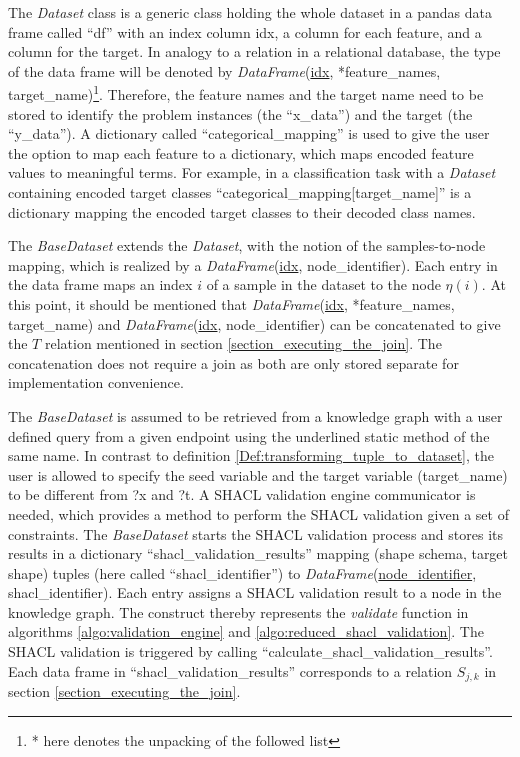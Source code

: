 The \emph{Dataset} class is a generic class holding the whole dataset in a pandas data frame called ``df'' with an index column idx, a column for each feature, and a column for the target. In analogy to a relation in a relational database, the type of the data frame will be denoted by \emph{DataFrame}(\underline{idx}, *feature\_names, target\_name)\footnote{* here denotes the unpacking of the followed list}.
Therefore, the feature names and the target name need to be stored to identify the problem instances (the ``x\_data'') and the target (the ``y\_data''). A dictionary called ``categorical\_mapping'' is used to give the user the option to map each feature to a dictionary, which maps encoded feature values to meaningful terms. For example, in a classification task with a \emph{Dataset} containing encoded target classes ``categorical\_mapping[target\_name]'' is a dictionary mapping the encoded target classes to their decoded class names.

The \emph{BaseDataset} extends the \emph{Dataset}, with the notion of the samples-to-node mapping, which is realized by a \emph{DataFrame}(\underline{idx}, node\_identifier). Each entry in the data frame maps an index $i$ of a sample in the dataset to the node $\eta(i)$. At this point, it should be mentioned that \emph{DataFrame}(\underline{idx}, *feature\_names, target\_name) and \emph{DataFrame}(\underline{idx}, node\_identifier) can be concatenated to give the $T$ relation mentioned in section \ref{section_executing_the_join}. The concatenation does not require a join as both are only stored separate for implementation convenience.

The \emph{BaseDataset} is assumed to be retrieved from a knowledge graph with a user defined query from a given endpoint using the underlined static method of the same name. In contrast to definition \ref{Def:transforming_tuple_to_dataset}, the user is allowed to specify the seed variable and the target variable (target\_name) to be different from ?x and ?t. A SHACL validation engine communicator is needed, which provides a method to perform the SHACL validation given a set of constraints. The \emph{BaseDataset} starts the SHACL validation process and stores its results in a dictionary ``shacl\_validation\_results'' mapping (shape schema, target shape) tuples (here called ``shacl\_identifier'') to \emph{DataFrame}(\underline{node\_identifier}, shacl\_identifier). Each entry assigns a SHACL validation result to a node in the knowledge graph. The construct thereby represents the \textit{validate} function in algorithms \ref{algo:validation_engine} and \ref{algo:reduced_shacl_validation}. The SHACL validation is triggered by calling ``calculate\_shacl\_validation\_results''. Each data frame in ``shacl\_validation\_results'' corresponds to a relation $S_{j,k}$ in section \ref{section_executing_the_join}.

